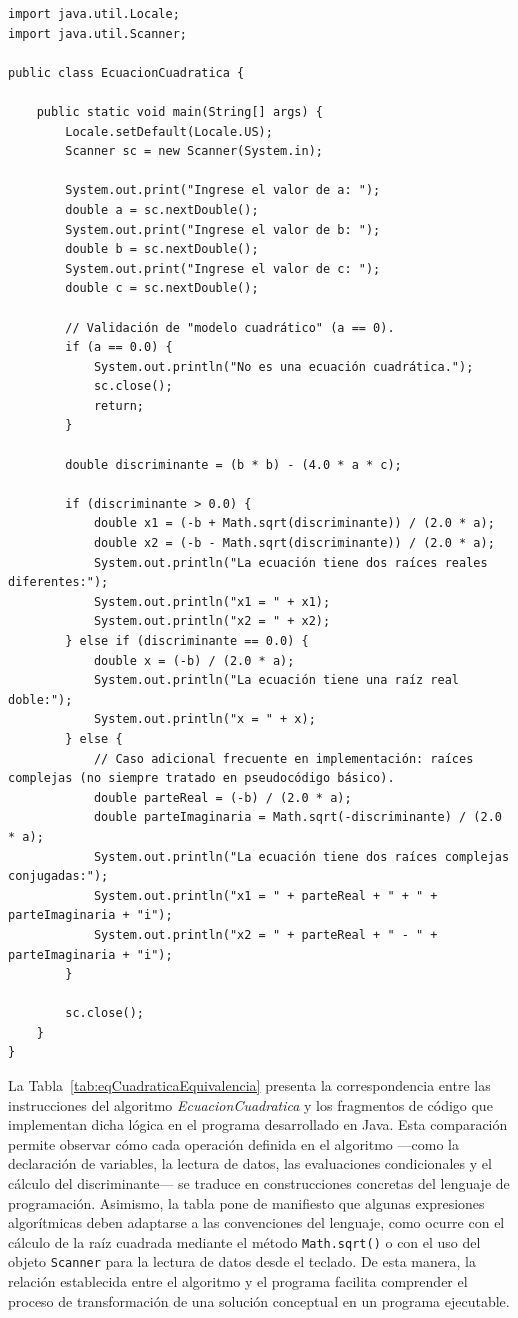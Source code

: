 \documentclass[12pt,twoside]{book}
\begin{document}
					\begin{lstlisting}[style=Java,caption={Resolución de una ecuación cuadrática},label={lst:ecuacionCuadraticaRI}]
import java.util.Locale;
import java.util.Scanner;

public class EcuacionCuadratica {
	
	public static void main(String[] args) {
		Locale.setDefault(Locale.US);
		Scanner sc = new Scanner(System.in);
		
		System.out.print("Ingrese el valor de a: ");
		double a = sc.nextDouble();
		System.out.print("Ingrese el valor de b: ");
		double b = sc.nextDouble();
		System.out.print("Ingrese el valor de c: ");
		double c = sc.nextDouble();
		
		// Validación de "modelo cuadrático" (a == 0).
		if (a == 0.0) {
			System.out.println("No es una ecuación cuadrática.");
			sc.close();
			return;
		}
		
		double discriminante = (b * b) - (4.0 * a * c);
		
		if (discriminante > 0.0) {
			double x1 = (-b + Math.sqrt(discriminante)) / (2.0 * a);
			double x2 = (-b - Math.sqrt(discriminante)) / (2.0 * a);
			System.out.println("La ecuación tiene dos raíces reales diferentes:");
			System.out.println("x1 = " + x1);
			System.out.println("x2 = " + x2);
		} else if (discriminante == 0.0) {
			double x = (-b) / (2.0 * a);
			System.out.println("La ecuación tiene una raíz real doble:");
			System.out.println("x = " + x);
		} else {
			// Caso adicional frecuente en implementación: raíces complejas (no siempre tratado en pseudocódigo básico).
			double parteReal = (-b) / (2.0 * a);
			double parteImaginaria = Math.sqrt(-discriminante) / (2.0 * a);
			System.out.println("La ecuación tiene dos raíces complejas conjugadas:");
			System.out.println("x1 = " + parteReal + " + " + parteImaginaria + "i");
			System.out.println("x2 = " + parteReal + " - " + parteImaginaria + "i");
		}
		
		sc.close();
	}
} \end{lstlisting}

					\noindent
					La Tabla~\ref{tab:eqCuadraticaEquivalencia} presenta la correspondencia entre las instrucciones del algoritmo \textit{EcuacionCuadratica} y los fragmentos de código que implementan dicha lógica en el programa desarrollado en Java. Esta comparación permite observar cómo cada operación definida en el algoritmo —como la declaración de variables, la lectura de datos, las evaluaciones condicionales y el cálculo del discriminante— se traduce en construcciones concretas del lenguaje de programación. Asimismo, la tabla pone de manifiesto que algunas expresiones algorítmicas deben adaptarse a las convenciones del lenguaje, como ocurre con el cálculo de la raíz cuadrada mediante el método \texttt{Math.sqrt()} o con el uso del objeto \texttt{Scanner} para la lectura de datos desde el teclado. De esta manera, la relación establecida entre el algoritmo y el programa facilita comprender el proceso de transformación de una solución conceptual en un programa ejecutable.
					
\end{document}
